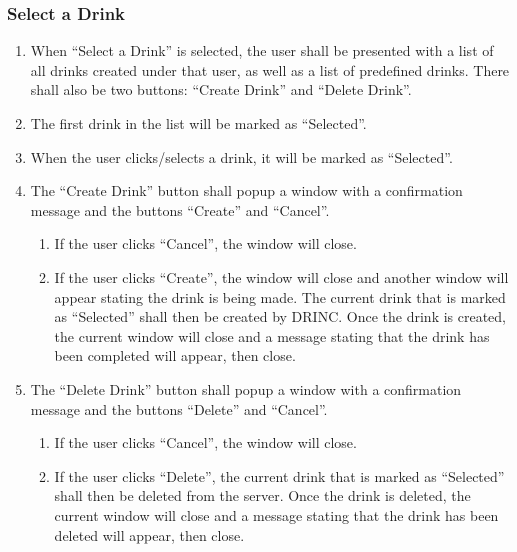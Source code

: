 {\begin{enumerate}
        \end{enumerate}
        
    \subsubsection{Select a Drink}
       	
       	\begin{enumerate}
       		\item When ``Select a Drink'' is selected, the user shall be presented with a list of all drinks created under that user, as well as a list of predefined drinks. There shall also be two buttons: ``Create Drink'' and ``Delete Drink''.
			\item The first drink in the list will be marked as ``Selected''.
			\item When the user clicks/selects a drink, it will be marked as ``Selected''.
			\item The ``Create Drink'' button shall popup a window with a confirmation message and the buttons ``Create'' and ``Cancel''.
			\begin{enumerate}
				\item If the user clicks ``Cancel'', the window will close.
				\item If the user clicks ``Create'', the window will close and another window will appear stating the drink is being made. The current drink that is marked as ``Selected'' shall then be created by DRINC. Once the drink is created, the current window will close and a message stating that the drink has been completed will appear, then close.
			\end{enumerate}
			
			\item The ``Delete Drink'' button shall popup a window with a confirmation message and the buttons ``Delete'' and ``Cancel''.
			\begin{enumerate}
				\item If the user clicks ``Cancel'', the window will close.
				\item If the user clicks ``Delete'', the current drink that is marked as ``Selected'' shall then be deleted from the server. Once the drink is deleted, the current window will close and a message stating that the drink has been deleted will appear, then close.
			\end{enumerate}
		\end{enumerate}
		
}

